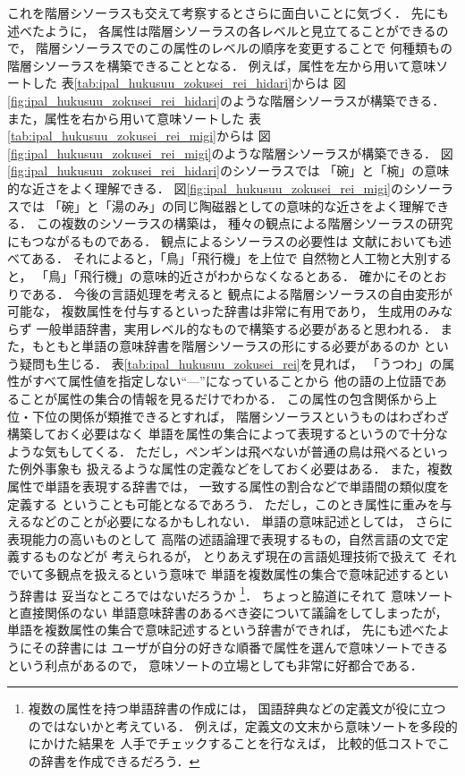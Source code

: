 これを階層シソーラスも交えて考察するとさらに面白いことに気づく．
先にも述べたように，
各属性は階層シソーラスの各レベルと見立てることができるので，
階層シソーラスでのこの属性のレベルの順序を変更することで
何種類もの階層シソーラスを構築できることとなる．
例えば，属性を左から用いて意味ソートした
表\ref{tab:ipal_hukusuu_zokusei_rei_hidari}からは
図\ref{fig:ipal_hukusuu_zokusei_rei_hidari}のような階層シソーラスが構築できる．
また，属性を右から用いて意味ソートした
表\ref{tab:ipal_hukusuu_zokusei_rei_migi}からは
図\ref{fig:ipal_hukusuu_zokusei_rei_migi}のような階層シソーラスが構築できる．
図\ref{fig:ipal_hukusuu_zokusei_rei_hidari}のシソーラスでは
「碗」と「椀」の意味的な近さをよく理解できる．
図\ref{fig:ipal_hukusuu_zokusei_rei_migi}のシソーラスでは
「碗」と「湯のみ」の同じ陶磁器としての意味的な近さをよく理解できる．
この複数のシソーラスの構築は，
種々の観点による階層シソーラスの研究にもつながるものである．
観点によるシソーラスの必要性は
文献\cite{miyazaki94A}においても述べてある．
それによると，「鳥」「飛行機」を上位で
自然物と人工物と大別すると，
「鳥」「飛行機」の意味的近さがわからなくなるとある．
確かにそのとおりである．
今後の言語処理を考えると
観点による階層シソーラスの自由変形が可能な，
複数属性を付与するといった辞書は非常に有用であり，
生成用のみならず
一般単語辞書，実用レベル的なもので構築する必要があると思われる．
また，もともと単語の意味辞書を階層シソーラスの形にする必要があるのか
という疑問も生じる．
表\ref{tab:ipal_hukusuu_zokusei_rei}を見れば，
「うつわ」の属性がすべて属性値を指定しない``---''になっていることから
他の語の上位語であることが属性の集合の情報を見るだけでわかる．
この属性の包含関係から上位・下位の関係が類推できるとすれば，
階層シソーラスというものはわざわざ構築しておく必要はなく
単語を属性の集合によって表現するというので十分なような気もしてくる．
ただし，ペンギンは飛べないが普通の鳥は飛べるといった例外事象も
扱えるような属性の定義などをしておく必要はある．
また，複数属性で単語を表現する辞書では，
一致する属性の割合などで単語間の類似度を定義する
ということも可能となるであろう．
ただし，このとき属性に重みを与えるなどのことが必要になるかもしれない．
単語の意味記述としては，
さらに表現能力の高いものとして
高階の述語論理で表現するもの，自然言語の文で定義するものなどが
考えられるが，
とりあえず現在の言語処理技術で扱えて
それでいて多観点を扱えるという意味で
単語を複数属性の集合で意味記述するという辞書は
妥当なところではないだろうか
\footnote{複数の属性を持つ単語辞書の作成には，
国語辞典などの定義文が役に立つのではないかと考えている．
例えば，定義文の文末から意味ソートを多段的にかけた結果を
人手でチェックすることを行なえば，
比較的低コストでこの辞書を作成できるだろう．}．
ちょっと脇道にそれて
意味ソートと直接関係のない
単語意味辞書のあるべき姿について議論をしてしまったが，
単語を複数属性の集合で意味記述するという辞書ができれば，
先にも述べたようにその辞書には
ユーザが自分の好きな順番で属性を選んで意味ソートできる
という利点があるので，
意味ソートの立場としても非常に好都合である．

